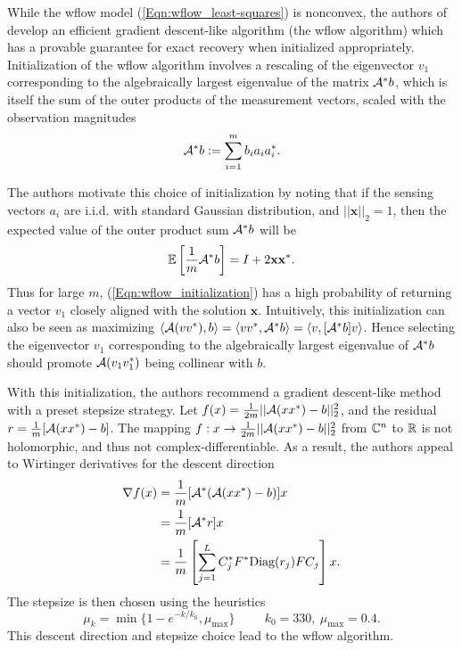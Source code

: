 While the wflow model (\ref{Eqn:wflow_least-squares}) is nonconvex, the authors of \cite{DBLP:journals/tit/CandesLS15} develop an efficient gradient descent-like algorithm (the wflow algorithm) which has a provable guarantee for exact recovery when initialized appropriately.
Initialization of the wflow algorithm involves a rescaling of the eigenvector $v_1$ corresponding to the algebraically largest eigenvalue of the matrix ${\mathcal A}^*b$, which is itself the sum of the outer products of the measurement vectors, scaled with the observation magnitudes
\begin{equation}			\label{Eqn:wflow_initialization}
{\mathcal A}^*b := \sum\limits_{\substack{i=1}}^{\substack{m}}b_i a_i a_i^*.
\end{equation}


The authors motivate this choice of initialization by noting that if the sensing vectors $a_i$ are i.i.d. with standard Gaussian distribution, and $||\mathbf{x}||_2 = 1$, then the expected value of the outer product sum ${\mathcal A}^*b$ will be
\begin{equation} 		\label{Eqn:wflow_expected_value}
{\mathbb E} \left[ \frac{1}{m}{\mathcal A}^* b \right] = I + 2\mathbf{x}\mathbf{x}^*.
\end{equation}
Thus for large $m$, (\ref{Eqn:wflow_initialization}) has a high probability of returning a vector $v_1$ closely aligned with the solution $\mathbf{x}$. Intuitively, this initialization can also be seen as maximizing $\langle {\mathcal A}(vv^*), b \rangle	= \langle v v^*, {\mathcal A}^* b \rangle = \langle v, [{\mathcal A}^* b] v \rangle$.  Hence selecting the eigenvector $v_1$ corresponding to the algebraically largest eigenvalue of ${\mathcal A}^*b$ should promote ${\mathcal A}(v_1v_1^*)$ being collinear with $b$.



With this initialization, the authors recommend a gradient descent-like method with a preset stepsize strategy.  Let $f(x) = \frac{1}{2m}||{\mathcal A}(xx^*) - b||_2^2$, and the residual $r = \frac{1}{m}[{\mathcal A}(xx^*) - b]$.  The mapping $f: x \rightarrow \frac{1}{2m}||{\mathcal A}(xx^*) - b||_2^2$ from ${\mathbb C}^n$ to ${\mathbb R}$ is not holomorphic, and thus not complex-differentiable.  As a result, the authors appeal to Wirtinger derivatives \cite[Section 6]{DBLP:journals/tit/CandesLS15} for the descent direction
\begin{equation}			\label{Eqn:wflow_derivative}
\begin{split}
\nabla f(x)
	&	= \frac{1}{m} [{\mathcal A}^*({\mathcal A}(xx^*) - b)]x
		\\
	&	= \frac{1}{m}  [{\mathcal A}^*r]x
		\\
	& =  \frac{1}{m}  \left[ \sum\limits_{\substack{j=1}}^{\substack{L}}
					C_j^* F^* \textnormal{Diag}(r_j) F C_j \right] x.
\end{split}
\end{equation}
The stepsize is then chosen using the heuristics \cite[Section 2]{DBLP:journals/tit/CandesLS15}
 \begin{equation} 			\label{Eqn:wflow_stepsize}
\mu_k = \min \{ 1-e^{-k/k_0}, \mu_{\max} \} \hspace{1cm} k_0 = 330, \ \mu_{\max} = 0.4.
\end{equation}
This descent direction and stepsize choice lead to the wflow algorithm.

